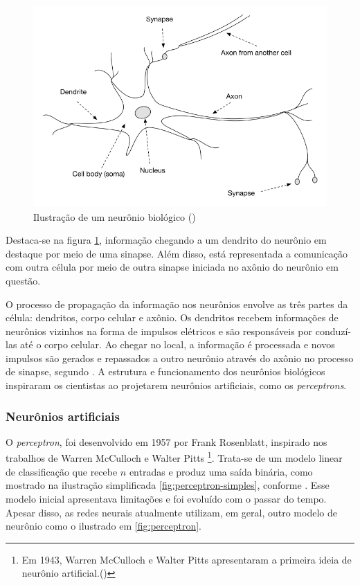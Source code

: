 \begin{figure}[H] 
  \includegraphics[width= 12cm]{../figuras/neuron.png}
  \caption{Ilustração de um neurônio biológico (\cite{dl-oreilly})}
  \label{fig:neuron}
\end{figure}

Destaca-se na figura \ref{fig:neuron}, informação chegando a um 
dendrito do neurônio em destaque
por meio de uma sinapse. Além disso, está representada a comunicação com outra célula
por meio de outra sinapse iniciada no axônio 
do neurônio em questão. 

O processo de propagação da informação nos neurônios 
envolve as três partes da célula: dendritos, corpo celular
e axônio.
Os dendritos recebem informações de neurônios vizinhos 
na forma de impulsos elétricos e são responsáveis 
por conduzí-las até o corpo celular. 
Ao chegar no local, a informação é processada e novos 
impulsos são gerados e repassados a outro neurônio 
através do axônio no processo de sinapse, segundo \cite{fund_deep_learning}.
A estrutura e funcionamento dos neurônios biológicos inspiraram
os cientistas ao projetarem neurônios artificiais, como 
os \textit{perceptrons}. 

\subsubsection{Neurônios artificiais}

O \textit{perceptron}, foi desenvolvido em 1957 por Frank 
Rosenblatt, inspirado nos trabalhos de Warren McCulloch e Walter Pitts
\footnote{Em 1943, Warren McCulloch e Walter Pitts apresentaram a 
primeira ideia de neurônio artificial.(\cite{neuronio})}.
Trata-se de um modelo linear de classificação que 
recebe $n$ entradas e produz uma saída binária, como mostrado 
na ilustração simplificada \ref{fig:perceptron-simples},
conforme \cite{deeplearningbook}.
Esse modelo inicial apresentava limitações e foi evoluído com o passar do 
tempo. Apesar disso, as redes neurais atualmente utilizam, em geral,
outro modelo de neurônio como o ilustrado em \ref{fig:perceptron}.


